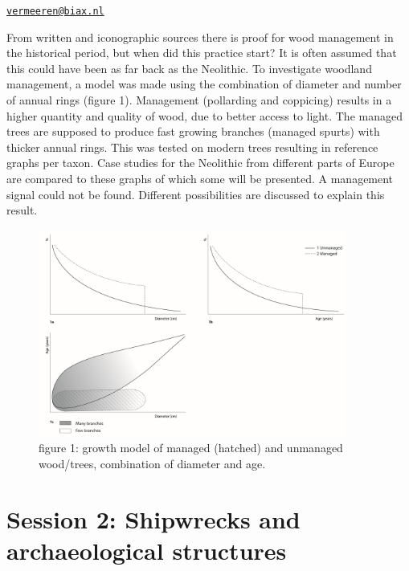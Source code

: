 \documentclass[
]{book}
\begin{document}
\href{mailto:vermeeren@biax.nl}{\nolinkurl{vermeeren@biax.nl}}

From written and iconographic sources there is proof for wood management in the historical period, but when did this practice start? It is often assumed that this could have been as far back as the Neolithic. To investigate woodland management, a model was made using the combination of diameter and number of annual rings (figure 1). Management (pollarding and coppicing) results in a higher quantity and quality of wood, due to better access to light. The managed trees are supposed to produce fast growing branches (managed spurts) with thicker annual rings. This was tested on modern trees resulting in reference graphs per taxon. Case studies for the Neolithic from different parts of Europe are compared to these graphs of which some will be presented. A management signal could not be found. Different possibilities are discussed to explain this result.

\begin{figure}
\centering
\includegraphics[width=0.9\textwidth,height=\textheight]{./figures/Vermeeren.png}
\caption{figure 1: growth model of managed (hatched) and unmanaged wood/trees, combination of diameter and age.}
\end{figure}

\hypertarget{session-2-shipwrecks-and-archaeological-structures}{%
\chapter*{Session 2: Shipwrecks and archaeological structures}\label{session-2-shipwrecks-and-archaeological-structures}}
\end{document}
